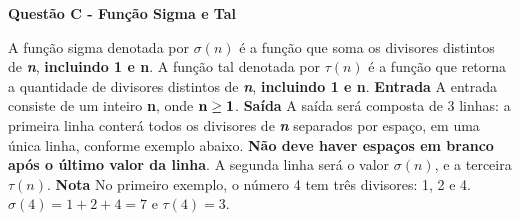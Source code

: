 \documentclass[a4paper, 12pt]{article}
\begin{document}
\newpage %
\begin{center}
\textbf{{\Large Questão C - Função Sigma e Tal}}
\end{center}
\vspace{5pt}
A função sigma denotada por $\sigma(n)$ é a função que soma os divisores distintos de \textbf{\textit{n}}, \textbf{incluindo 1 e n}. A função tal denotada por $\tau(n)$ é a função que retorna
a quantidade de divisores distintos de \textbf{\textit{n}}, \textbf{incluindo 1 e n}. 
\newline \newline
\textbf{{\large Entrada}} \newline
A entrada consiste de um inteiro \textbf{n}, onde $\textrm{\textbf{n}} \geq \textrm{\textbf{1}}$.
\newline \newline
\textbf{{\large Saída}} \newline
A saída será composta de 3 linhas: a primeira linha conterá todos os divisores de \textbf{\textit{n}} separados por espaço, em uma única linha, conforme exemplo abaixo. \textbf{Não deve haver espaços em branco após o último valor da linha}. A segunda linha será o valor $\sigma(n)$, e a terceira $\tau(n)$.
\newline \newline
\textbf{{\large Nota}} \newline
No primeiro exemplo, o número 4 tem três divisores: 1, 2 e 4. $\sigma(4) = 1 + 2 + 4 = 7$ e $\tau(4) = 3$.
\newline
\end{document}
